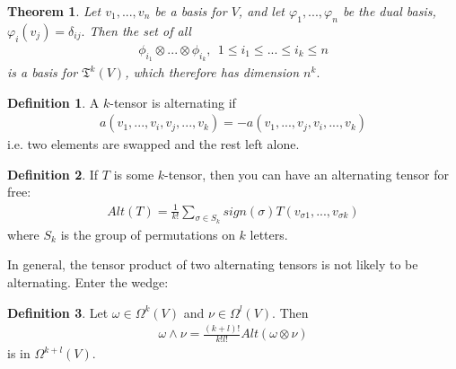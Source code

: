 \documentclass[20pt]{article}
\theoremstyle{plain}
\newtheorem{theorem}{Theorem}
\theoremstyle{definition}
\newtheorem{definition}{Definition}
\begin{document}
\vspace{3em}
\begin{theorem}
  Let $v_1, ..., v_n$ be a basis for $V$, and let 
  $\varphi_1, ..., \varphi_n$ be the dual basis, $\varphi_i(v_j) = \delta_{ij}.$
  Then the set of all 
  \begin{align}
    \phi_{i_1} \otimes ... \otimes \phi_{i_k}, \ \ 1 \leq i_1 \leq ... \leq i_k \leq n
  \end{align}
  is a basis for $\mathfrak{T}^k(V)$, which therefore has dimension $n^k.$
\end{theorem}


\begin{definition}
  A $k$-tensor is alternating if
  \begin{align}
    a(v_1, ..., v_i, v_j, ..., v_k) = -a(v_1, ..., v_j, v_i, ..., v_k)
  \end{align}
  i.e. two elements are swapped and the rest left alone.
\end{definition}



\vspace{3em}
\begin{definition}
  If $T$ is some $k$-tensor, 
  then you can have an alternating tensor for free:
  \begin{align}
    Alt(T) = \frac{1}{k!}\sum_{\sigma \in S_k} sign(\sigma)
      T(v_{\sigma1}, ..., v_{\sigma k})
  \end{align}
  where $S_k$ is the group of permutations on $k$ letters.
\end{definition}

\vspace{3em}
In general, the tensor product of two alternating tensors is not likely to be alternating.  Enter the wedge:


\begin{definition}
  Let $\omega \in \Omega^k(V)$ and $\nu \in \Omega^l(V)$.
  Then
  \begin{align}
    \omega \wedge \nu = \frac{(k+l)!}{k!l!}Alt(\omega \otimes \nu)
  \end{align}
  is in $\Omega^{k+l}(V).$
\end{definition}
\end{document}
